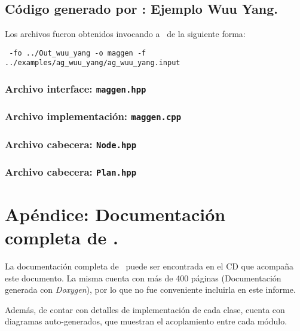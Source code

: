 \section{Código generado por \maggen: Ejemplo Wuu Yang.}
\label{append:agwuuyangcode}

Los archivos fueron obtenidos invocando a \maggen\ de la siguiente forma:

\begin{center}
\footnotesize
\texttt{\maggen\ -fo ../Out\_wuu\_yang -o maggen -f  ../examples/ag\_wuu\_yang/ag\_wuu\_yang.input}
\end{center}

\subsection{Archivo interface: \texttt{maggen.hpp}}
\label{append:maggenhpp}


\subsection{Archivo implementación: \texttt{maggen.cpp}}
\label{append:maggencpp}


\subsection{Archivo cabecera: \texttt{Node.hpp}}
\label{append:nodehpp}


\subsection{Archivo cabecera: \texttt{Plan.hpp}}
\label{append:planhpp}


\normalsize
\chapter{Apéndice: Documentación completa de \maggen.}
\label{chap:appendix-b}
La documentación completa de \maggen\ puede ser encontrada en el CD que acompaña este documento. La misma cuenta con más de 400 páginas (Documentación generada con \textit{Doxygen}), por lo que no fue conveniente incluirla en este informe. 

Además, de contar con detalles de implementación de cada clase, cuenta con diagramas auto-generados, que muestran el acoplamiento entre cada módulo.


